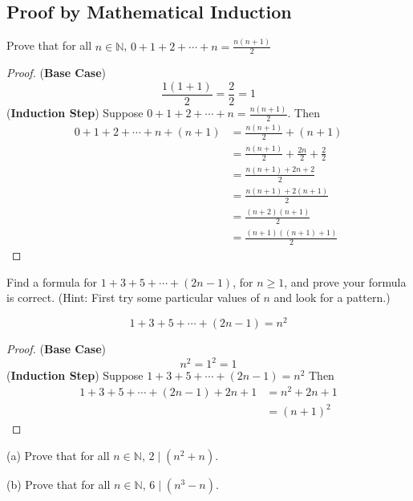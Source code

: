 \subsection{Proof by Mathematical Induction}

\begin{tcolorbox}[title=Problem 1, breakable]
    Prove that for all $n \in \mathbb{N}$,
        $0 + 1 + 2 + \cdots + n = \frac{n(n + 1)}{2}$
\end{tcolorbox}

\begin{proof}
    (\textbf{Base Case}) 
    \[\frac{1(1 + 1)}{2} = \frac{2}{2} = 1\]
    (\textbf{Induction Step}) Suppose $0 + 1 + 2 + \cdots + n = \frac{n(n + 1)}{2}$.
    Then 
    \begin{align*}
        0 + 1 + 2 + \cdots + n + (n + 1) 
            &= \frac{n(n + 1)}{2} + (n + 1) \\
            &= \frac{n(n + 1)}{2} + \frac{2n}{2} + \frac{2}{2} \\
            &= \frac{n(n + 1) + 2n + 2}{2} \\
            &= \frac{n(n + 1) + 2(n + 1)}{2} \\
            &= \frac{(n + 2)(n + 1)}{2} \\
            &= \frac{(n + 1)((n + 1) + 1)}{2}
    \end{align*}
\end{proof}

\newpage
\begin{tcolorbox}[title=Problem 4, breakable]
    Find a formula for $1 + 3 + 5 + \cdots + (2n - 1)$,
        for $n \ge 1$, and prove your formula is correct.
    (Hint: First try some particular values of $n$ and 
           look for a pattern.)
\end{tcolorbox}
\[1 + 3 + 5 + \cdots + (2n - 1) = n^2\]
\begin{proof}
    (\textbf{Base Case})
    \[n^2 = 1^2 = 1\]
    (\textbf{Induction Step})
    Suppose $1 + 3 + 5 + \cdots + (2n - 1) = n^2$
    Then 
    \begin{align*}
        1 + 3 + 5 + \cdots + (2n - 1) + 2n + 1 
            &= n^2 + 2n + 1 \\
            &= (n + 1)^2
    \end{align*}
\end{proof}

\begin{tcolorbox}[title=Problem 9, breakable]
    (a) Prove that for all $n \in \mathbb{N}$, $2 \mid (n^2 + n)$.

    (b) Prove that for all $n \in \mathbb{N}$, $6 \mid (n^3 - n)$.
\end{tcolorbox}

